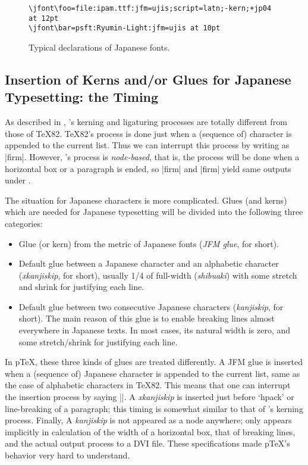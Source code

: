 \documentclass{ajt}
\begin{document}
\begin{figure}
\begin{verbatim}
\jfont\foo=file:ipam.ttf:jfm=ujis;script=latn;-kern;+jp04 at 12pt
\jfont\bar=psft:Ryumin-Light:jfm=ujis at 10pt
\end{verbatim}
\caption{Typical declarations of Japanese fonts.}
\label{fig-jfdef}
\end{figure}

\subsection{Insertion of Kerns and/or Glues for Japanese Typesetting: the Timing}
\label{ssec-jglue}

As described in \cite{luatexref}, \LuaTeX's kerning and ligaturing
processes are totally different from those of \TeX82.  \TeX82's process is
done just when a (sequence of) character is appended to the current
list. Thus we can interrupt this process by writing as
|f{}irm|. However, \LuaTeX's process is \emph{node-based}, that is, the
process will be done when a horizontal box or a paragraph is ended, so
|f{}irm| and |firm| yield  same outputs under \LuaTeX.

The situation for Japanese characters is more complicated.
Glues (and kerns) which are needed for Japanese
typesetting will be divided into the following three categories:
\begin{itemize}
\item Glue (or kern) from the metric of Japanese fonts (\emph{JFM glue},
      for short). 

\item Default glue between a Japanese character and an alphabetic
      character (\emph{xkanjiskip}, for short), usually 1/4 of
      full-width (\emph{shibuaki}) with some stretch and shrink for
      justifying each line.
\item Default glue between two consecutive Japanese characters
      (\emph{kanjiskip}, for short). The main reason of this glue is to
      enable breaking lines almost everywhere in Japanese texts. In most
      cases, its natural width is zero, and some stretch/shrink for
      justifying each line.
\end{itemize}
In p\TeX, these three kinds of glues are treated differently. A JFM glue
is inserted when a (sequence of) Japanese character is appended to the
current list, same as the case of alphabetic characters in \TeX82. This
means that one can interrupt the insertion process by saying |{}|.  A
\emph{xkanjiskip} is inserted just before `hpack' or line-breaking of a
paragraph; this timing is somewhat similar to that of \LuaTeX's kerning
process. Finally, A \emph{kanjiskip} is not appeared as a node anywhere;
only appears implicitly in calculation of the width of a horizontal box,
that of breaking lines, and the actual output process to a DVI
file. These specifications made p\TeX's behavior very hard to
understand.
\end{document}
